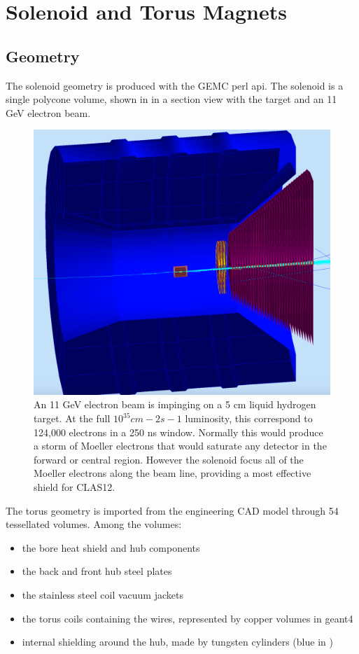 \section{Solenoid and Torus Magnets}


\subsection{Geometry}
The solenoid geometry is produced with the GEMC perl api. The solenoid is a single polycone volume, shown in 
in a section view with the target and an 11 GeV electron beam.

\begin{figure}
	\centering
	\includegraphics[width=0.98\columnwidth,keepaspectratio]{img/solenoid.png}
   \caption{An 11 GeV electron beam is impinging on a 5 cm liquid hydrogen target. At the full $10^{35} cm-2s-1$ luminosity, this correspond to
            124,000 electrons in a 250 ns window. Normally this would produce a storm of Moeller electrons that would saturate any detector in the forward or central
				region. However the solenoid focus all of the Moeller electrons along the beam line, providing a most effective shield for CLAS12.
            }
	\label{fig:solenoid}
\end{figure}

The torus geometry is imported from the engineering CAD model through 54 tessellated volumes. Among the volumes:

\begin{itemize}
	\item the bore heat shield and hub components
	\item the back and front hub steel plates
	\item the stainless steel coil vacuum jackets
	\item the torus coils containing the wires, represented by copper volumes in geant4
\item internal shielding around the hub, made by tungsten cylinders (blue in )
\end{itemize}

